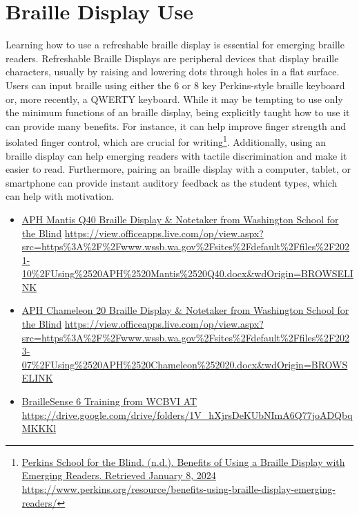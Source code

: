 {{\pagebreak\hypertarget{appx10}{}\section[Braille Display Use]{Braille Display Use}\label{appx10}
Learning how to use a refreshable braille display is essential for emerging braille readers. Refreshable Braille Displays are peripheral devices that display braille characters, usually by raising and lowering dots through holes in a flat surface. Users can input braille using either the 6 or 8 key Perkins-style braille keyboard or, more recently, a QWERTY keyboard.  While it may be tempting to use only the minimum functions of an braille display, being explicitly taught how to use it can provide many benefits. For instance, it can help improve finger strength and isolated finger control, which are crucial for writing\footnote{\raggedright \href{https://www.perkins.org/resource/benefits-using-braille-display-emerging-readers/}{Perkins School for the Blind. (n.d.). Benefits of Using a Braille Display with Emerging Readers. Retrieved January 8, 2024} \url{https://www.perkins.org/resource/benefits-using-braille-display-emerging-readers/}}. Additionally, using an braille display can help emerging readers with tactile discrimination and make it easier to read. Furthermore, pairing an braille display with a computer, tablet, or smartphone can provide instant auditory feedback as the student types, which can help with motivation.
\begin{itemize}[leftmargin=*]
\item \href{https://view.officeapps.live.com/op/view.aspx?src=https%3A%2F%2Fwww.wssb.wa.gov%2Fsites%2Fdefault%2Ffiles%2F2021-10%2FUsing%2520APH%2520Mantis%2520Q40.docx&wdOrigin=BROWSELINK}{APH Mantis Q40 Braille Display \& Notetaker from Washington School for the Blind} \break\url{https://view.officeapps.live.com/op/view.aspx?src=https%3A%2F%2Fwww.wssb.wa.gov%2Fsites%2Fdefault%2Ffiles%2F2021-10%2FUsing%2520APH%2520Mantis%2520Q40.docx&wdOrigin=BROWSELINK}
\item \href{https://view.officeapps.live.com/op/view.aspx?src=https%3A%2F%2Fwww.wssb.wa.gov%2Fsites%2Fdefault%2Ffiles%2F2023-07%2FUsing%2520APH%2520Chameleon%252020.docx&wdOrigin=BROWSELINK}{APH Chameleon 20 Braille Display \& Notetaker from Washington School for the Blind} \break\url{https://view.officeapps.live.com/op/view.aspx?src=https%3A%2F%2Fwww.wssb.wa.gov%2Fsites%2Fdefault%2Ffiles%2F2023-07%2FUsing%2520APH%2520Chameleon%252020.docx&wdOrigin=BROWSELINK}
\item \href{https://drive.google.com/drive/folders/1V_hXjrsDeKUbNImA6Q77joADQbqMKKKl}{BrailleSense 6 Training from WCBVI AT} \break\url{https://drive.google.com/drive/folders/1V_hXjrsDeKUbNImA6Q77joADQbqMKKKl}

\end{itemize}}}
